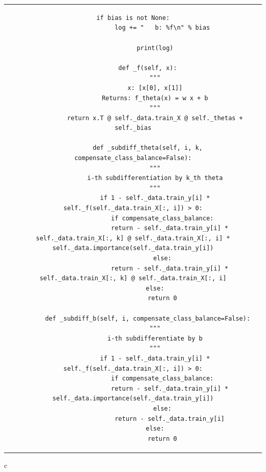 \documentclass[dvipdfmx]{jsarticle}
\begin{document}
\begin{center}
\begin{tabular}{c}
\begin{lstlisting}[]
            if bias is not None:
                log += "   b: %f\n" % bias

            print(log)

        def _f(self, x):
            """
            x: [x[0], x[1]]
            Returns: f_theta(x) = w x + b
            """
            return x.T @ self._data.train_X @ self._thetas + self._bias

        def _subdiff_theta(self, i, k, compensate_class_balance=False):
            """
            i-th subdifferentiation by k_th theta
            """
            if 1 - self._data.train_y[i] * self._f(self._data.train_X[:, i]) > 0:
                if compensate_class_balance:
                    return - self._data.train_y[i] * self._data.train_X[:, k] @ self._data.train_X[:, i] * self._data.importance(self._data.train_y[i])
                else:
                    return - self._data.train_y[i] * self._data.train_X[:, k] @ self._data.train_X[:, i]
            else:
                return 0

        def _subdiff_b(self, i, compensate_class_balance=False):
            """
            i-th subdifferentiate by b
            """
            if 1 - self._data.train_y[i] * self._f(self._data.train_X[:, i]) > 0:
                if compensate_class_balance:
                    return - self._data.train_y[i] * self._data.importance(self._data.train_y[i])
                else:
                    return - self._data.train_y[i]
            else:
                return 0
  \end{lstlisting}
\end{tabular}{c}
\end{center}
\end{document}

